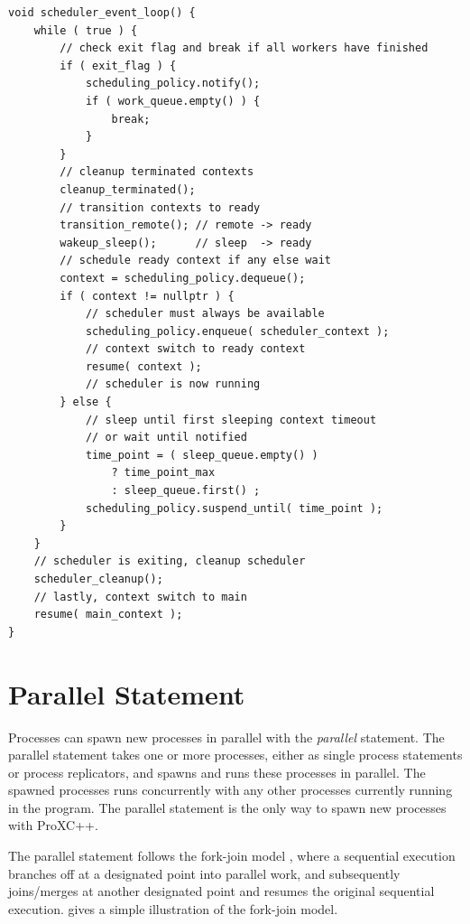 \begin{lstfloat}
\begin{lstlisting}[caption={Scheduler event loop pseudo code.}, label={lst:scheduler_event_loop}, style={CustomC}, xleftmargin={4em}]
void scheduler_event_loop() {
    while ( true ) {
        // check exit flag and break if all workers have finished
        if ( exit_flag ) {
            scheduling_policy.notify();
            if ( work_queue.empty() ) {
                break;
            }
        }
        // cleanup terminated contexts
        cleanup_terminated();
        // transition contexts to ready
        transition_remote(); // remote -> ready
        wakeup_sleep();      // sleep  -> ready
        // schedule ready context if any else wait
        context = scheduling_policy.dequeue();
        if ( context != nullptr ) {
            // scheduler must always be available
            scheduling_policy.enqueue( scheduler_context );
            // context switch to ready context
            resume( context );
            // scheduler is now running
        } else {
            // sleep until first sleeping context timeout
            // or wait until notified
            time_point = ( sleep_queue.empty() )
                ? time_point_max
                : sleep_queue.first() ;
            scheduling_policy.suspend_until( time_point );
        }
    }
    // scheduler is exiting, cleanup scheduler
    scheduler_cleanup();
    // lastly, context switch to main
    resume( main_context );
}
\end{lstlisting}
\end{lstfloat}





\FloatBarrier
\section{Parallel Statement}
\label{sec:parallel_statement}

Processes can spawn new processes in parallel with the \textit{parallel} statement. The parallel statement takes one or more processes, either as single process statements or process replicators, and spawns and runs these processes in parallel. The spawned processes runs concurrently with any other processes currently running in the program. The parallel statement is the only way to spawn new processes with ProXC++.

The parallel statement follows the fork\hyp{}join model \citep[page 88]{mccool2012structured}, where a sequential execution branches off at a designated point into parallel work, and subsequently joins/merges at another designated point and resumes the original sequential execution.  gives a simple illustration of the fork\hyp{}join model.

